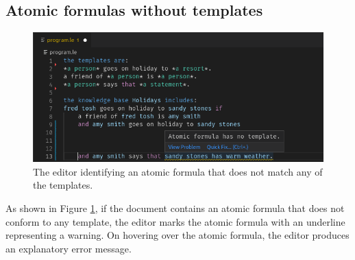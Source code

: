 \documentclass[../main.tex]{subfiles}
\begin{document}
\subsection{Atomic formulas without templates}
\label{section:no-template-feature}
\begin{figure}[h!]
\centering
\includegraphics[width = \linewidth]{./figures/atomic-formula-no-template.png}
\caption{The editor identifying an atomic formula that does not match any of the templates.}
\label{fig:no-template-diag}
\end{figure}
As shown in Figure \ref{fig:no-template-diag}, if the document contains an atomic formula that does not conform to any template, the editor marks the atomic formula with an underline representing a warning. On hovering over the atomic formula, the editor produces an explanatory error message. 
\end{document}
